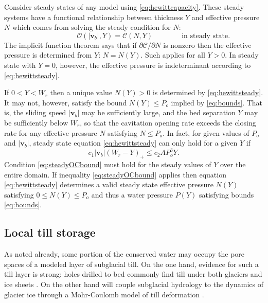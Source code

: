 \documentclass[11pt,final]{amsart}
\newcommand\bv{\mathbf{v}}
\begin{document}
Consider steady states of any model using \eqref{eq:hewittcapacity}.  These steady systems have a functional relationship between thickness $Y$ and effective pressure $N$ which comes from solving the steady condition for $N$:
\begin{equation}
\phantom{foo} \qquad \qquad \mathcal{O}(|\bv_b|,Y) = \mathcal{C}(N,Y) \qquad \qquad \text{in steady state}. \label{eq:hewittsteady}
\end{equation}
The implicit function theorem says that if $\partial\mathcal{C}/\partial N$ is nonzero then the effective pressure is determined from $Y$: $N=N(Y)$.  Such applies for all $Y> 0$.  In steady state with $Y=0$, however, the effective pressure is indeterminant according to \eqref{eq:hewittsteady}.

If $0<Y<W_r$ then a unique value $N(Y)>0$ is determined by \eqref{eq:hewittsteady}.  It may not, however, satisfy the bound $N(Y) \le P_o$ implied by \eqref{eq:bounds}.  That is, the sliding speed $|\bv_b|$ may be sufficiently large, and the bed separation $Y$ may be sufficiently below $W_r$, so that the cavitation opening rate exceeds the closing rate for any effective pressure $N$ satisfying $N\le P_o$.  In fact, for given values of $P_o$ and $|\bv_b|$, steady state equation \eqref{eq:hewittsteady} can only hold for a given $Y$ if
\begin{equation}
c_1 |\bv_b| (W_r - Y)_+ \le c_2 A P_o^3 Y. \label{eq:steadyOCbound}
\end{equation}
Condition \eqref{eq:steadyOCbound} must hold for the steady values of $Y$ over the entire domain.  If inequality \eqref{eq:steadyOCbound} applies then equation \eqref{eq:hewittsteady} determines a valid steady state effective pressure $N(Y)$ satisfying $0\le N(Y) \le P_o$ and thus a water pressure $P(Y)$ satisfying bounds \eqref{eq:bounds}.

\subsection*{Local till storage}  As noted already, some portion of the conserved water may occupy the pore spaces of a modeled layer of subglacial till.  On the one hand, evidence for such a till layer is strong: holes drilled to bed commonly find till under both glaciers and ice sheets \citep{Paterson}.  On the other hand will couple subglacial hydrology to the dynamics of glacier ice through a Mohr-Coulomb model of till deformation \citep{BBssasliding,SchoofTill,TrufferEchelmeyerHarrison}.
\end{document}
